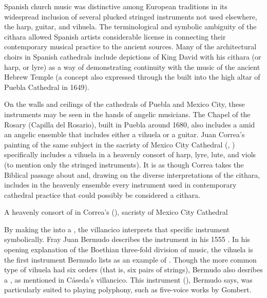 
Spanish church music was distinctive among European traditions in its
widespread inclusion of several plucked stringed instruments not used
elsewhere, the harp, guitar, and vihuela. 
The terminological and symbolic ambiguity of the cithara allowed Spanish
artists considerable license in connecting their contemporary musical practice
to the ancient sources.
Many of the architectural choirs in Spanish cathedrals include depictions of
King David with his cithara (or harp, or lyre) as a way of demonstrating
continuity with the music of the ancient Hebrew Temple (a concept also
expressed through the  built into the high altar of
Puebla Cathedral in 1649).


On the walls and ceilings of the cathedrals of Puebla and Mexico City, these
instruments may be seen in the hands of angelic musicians.
The Chapel of the Rosary (Capilla del Rosario), built in Puebla around 1680,
also includes a  amid an angelic ensemble
that includes either a vihuela or a guitar.
Juan Correa's painting of the same subject in the sacristy of Mexico City
Cathedral (, ) specifically includes a
vihuela in a heavenly consort of harp, lyre, lute, and viols (to mention only
the stringed instruments).
It is as though Correa takes the Biblical passage about  and, drawing on the diverse interpretations of
the cithara, includes in the heavenly ensemble every instrument used in
contemporary cathedral practice that could possibly be considered a cithara.


{A heavenly consort of  in Correa's  (), sacristy of Mexico City Cathedral}

By making the  into a , the villancico interprets
that specific instrument symbolically.
Fray Juan Bermudo describes the instrument in his 1555 .%
    \Autocite{Bermudo:Declaracion}
In his opening explanation of the Boethian three-fold division of music, the
vihuela is the first instrument Bermudo lists as an example of
 .
Though the more common type of vihuela had six orders (that is, six pairs of
strings), Bermudo also desribes a , as
mentioned in Cáseda's villancico.%
    \Autocite[90v--110r]{Bermudo:Declaracion}
This instrument (), Bermudo says, was particularly
suited to playing polyphony, such as five-voice works by Gombert.

